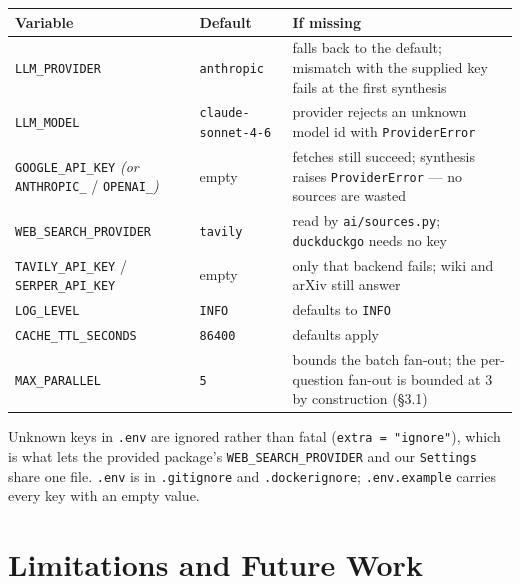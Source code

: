 \documentclass[11pt,a4paper]{article}
\begin{document}
\begin{center}\small
\begin{tabularx}{\textwidth}{@{}llX@{}}
\toprule
\textbf{Variable} & \textbf{Default} & \textbf{If missing} \\
\midrule
\texttt{LLM\_PROVIDER}      & \texttt{anthropic} & falls back to the default; mismatch with the supplied key fails at the first synthesis \\
\texttt{LLM\_MODEL}         & \texttt{claude-sonnet-4-6} & provider rejects an unknown model id with \texttt{ProviderError} \\
\texttt{GOOGLE\_API\_KEY} \textit{(or} \texttt{ANTHROPIC\_} / \texttt{OPENAI\_}\textit{)} & empty & fetches still succeed; synthesis raises \texttt{ProviderError} --- no sources are wasted \\
\texttt{WEB\_SEARCH\_PROVIDER} & \texttt{tavily} & read by \texttt{ai/sources.py}; \texttt{duckduckgo} needs no key \\
\texttt{TAVILY\_API\_KEY} / \texttt{SERPER\_API\_KEY} & empty & only that backend fails; wiki and arXiv still answer \\
\texttt{LOG\_LEVEL}         & \texttt{INFO}  & defaults to \texttt{INFO} \\
\texttt{CACHE\_TTL\_SECONDS} & \texttt{86400} & defaults apply \\
\texttt{MAX\_PARALLEL}      & \texttt{5}     & bounds the batch fan-out; the per-question fan-out is bounded at 3 by construction (\S3.1) \\
\bottomrule
\end{tabularx}
\end{center}

Unknown keys in \texttt{.env} are ignored rather than fatal (\texttt{extra = "ignore"}), which is
what lets the provided package's \texttt{WEB\_SEARCH\_PROVIDER} and our \texttt{Settings} share
one file. \texttt{.env} is in \texttt{.gitignore} and \texttt{.dockerignore};
\texttt{.env.example} carries every key with an empty value.

\section{Limitations and Future Work}\label{sec:limits}
\end{document}
